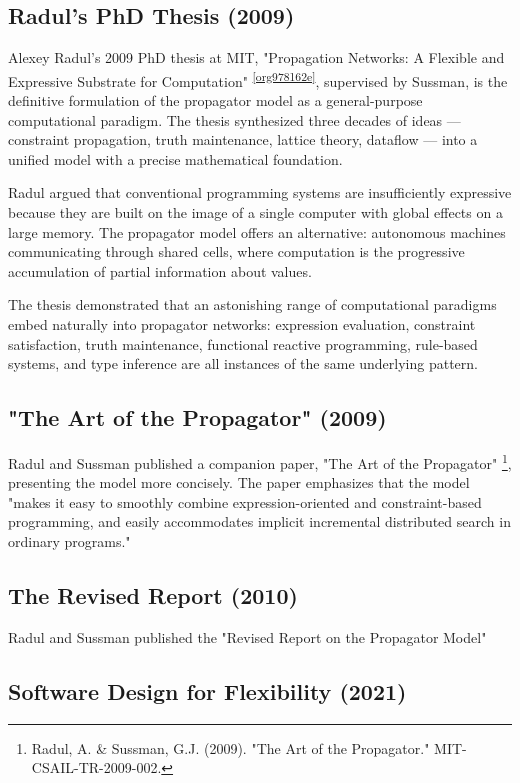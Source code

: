 \documentclass[11pt]{article}
\begin{document}
\subsection{Radul's PhD Thesis (2009)}
\label{sec:orgff987da}

Alexey Radul's 2009 PhD thesis at MIT, "Propagation Networks: A Flexible
and Expressive Substrate for Computation" \textsuperscript{\ref{org978162e}}, supervised
by Sussman, is the definitive formulation of the propagator model as a
general-purpose computational paradigm. The thesis synthesized three
decades of ideas --- constraint propagation, truth maintenance, lattice
theory, dataflow --- into a unified model with a precise mathematical
foundation.

Radul argued that conventional programming systems are insufficiently
expressive because they are built on the image of a single computer with
global effects on a large memory. The propagator model offers an
alternative: autonomous machines communicating through shared cells,
where computation is the progressive accumulation of partial information
about values.

The thesis demonstrated that an astonishing range of computational
paradigms embed naturally into propagator networks: expression
evaluation, constraint satisfaction, truth maintenance, functional
reactive programming, rule-based systems, and type inference are all
instances of the same underlying pattern.
\subsection{"The Art of the Propagator" (2009)}
\label{sec:org524c90e}

Radul and Sussman published a companion paper, "The Art of the
Propagator" \footnote{Radul, A. \& Sussman, G.J. (2009). "The Art of the
Propagator." MIT-CSAIL-TR-2009-002.}, presenting the model more concisely. The
paper emphasizes that the model "makes it easy to smoothly combine
expression-oriented and constraint-based programming, and easily
accommodates implicit incremental distributed search in ordinary
programs."
\subsection{The Revised Report (2010)}
\label{sec:org427cf9c}

Radul and Sussman published the "Revised Report on the Propagator Model"
\subsection{Software Design for Flexibility (2021)}
\label{sec:orgd35cf7c}
\end{document}
